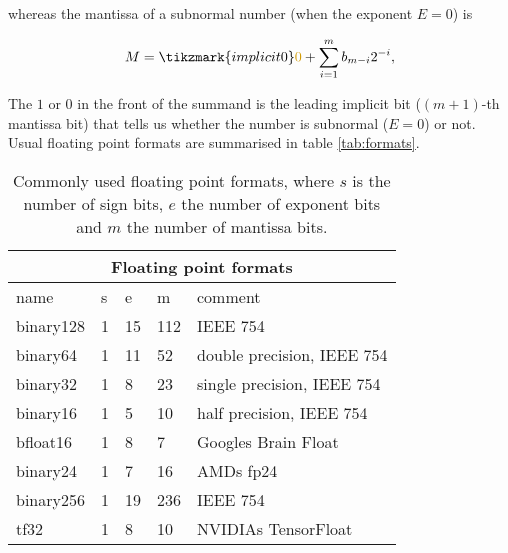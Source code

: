 \documentclass{article}
\theoremstyle{definition}
\numberwithin{equation}{section}
\begin{document}
whereas the mantissa of a subnormal number (when the exponent $E=0$) is

\begin{align*}
    M = \tikzmark{implicit0}\textcolor{cyellow}{0} + \sum_{i=1}^{m} b_{m-i} 2^{-i},
\end{align*}


The $1$ or $0$ in the front of the summand is the leading \textcolor{cyellow}{implicit bit} ($(m+1)$-th mantissa bit) that tells us whether the number is subnormal ($E=0$) or not. Usual floating point formats are summarised in table \ref{tab:formats}.

\begin{table}[H]
\centering

    \begin{tabular}{ |p{2cm}||p{1cm}|p{1cm}|p{1cm}|p{6cm}|  }
        \hline
        \multicolumn{5}{|c|}{Floating point formats} \\
        \hline
        name & s & e & m & comment \\
        \hline
        binary128 & 1 & 15 & 112 & IEEE 754 \\
        \gls{binary64}  & 1 & 11 & 52 & double precision, IEEE 754 \\
        \gls{binary32}  & 1 & 8  & 23 & single precision, IEEE 754 \\
        \gls{binary16}  & 1 & 5  & 10 & half precision, IEEE 754 \\
        \hline
        bfloat16  & 1 & 8  & 7 & Googles Brain Float\\
        binary24  & 1 & 7  & 16 & AMDs fp24 \\
        binary256 & 1 & 19 & 236 & IEEE 754 \\
        tf32      & 1 & 8  & 10 & NVIDIAs TensorFloat \footnotemark \\
        \hline
    \end{tabular}
    \caption{\label{tab:limits} Commonly used floating point formats, where $s$ is the number of sign bits, $e$ the number of exponent bits and $m$ the number of mantissa bits.}
    
\end{table}
\end{document}
